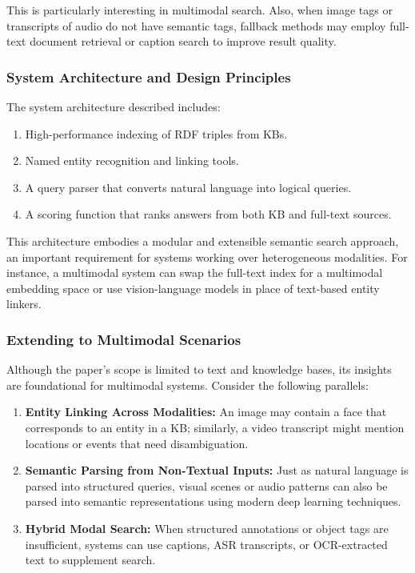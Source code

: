 \documentclass[conference]{IEEEtran}
\begin{document}
This is particularly interesting in multimodal search. Also, when image tags or transcripts of audio do not have semantic tags, fallback methods may employ full-text document retrieval or caption search to improve result quality.

\subsubsection{System Architecture and Design Principles}
The system architecture described includes:
\begin{enumerate}
    \item High-performance indexing of RDF triples from KBs.
    \item Named entity recognition and linking tools.
    \item A query parser that converts natural language into logical queries.
    \item A scoring function that ranks answers from both KB and full-text sources.
\end{enumerate}

This architecture embodies a modular and extensible semantic search approach, an important requirement for systems working over heterogeneous modalities. For instance, a multimodal system can swap the full-text index for a multimodal embedding space or use vision-language models in place of text-based entity linkers.


\subsubsection{Extending to Multimodal Scenarios}
Although the paper's scope is limited to text and knowledge bases, its insights are foundational for multimodal systems. Consider the following parallels:
\begin{enumerate}
    \item \textbf{Entity Linking Across Modalities:} An image may contain a face that corresponds to an entity in a KB; similarly, a video transcript might mention locations or events that need disambiguation.
    \item \textbf{Semantic Parsing from Non-Textual Inputs:} Just as natural language is parsed into structured queries, visual scenes or audio patterns can also be parsed into semantic representations using modern deep learning techniques.
    \item \textbf{Hybrid Modal Search:} When structured annotations or object tags are insufficient, systems can use captions, ASR transcripts, or OCR-extracted text to supplement search.
\end{enumerate}
\end{document}

